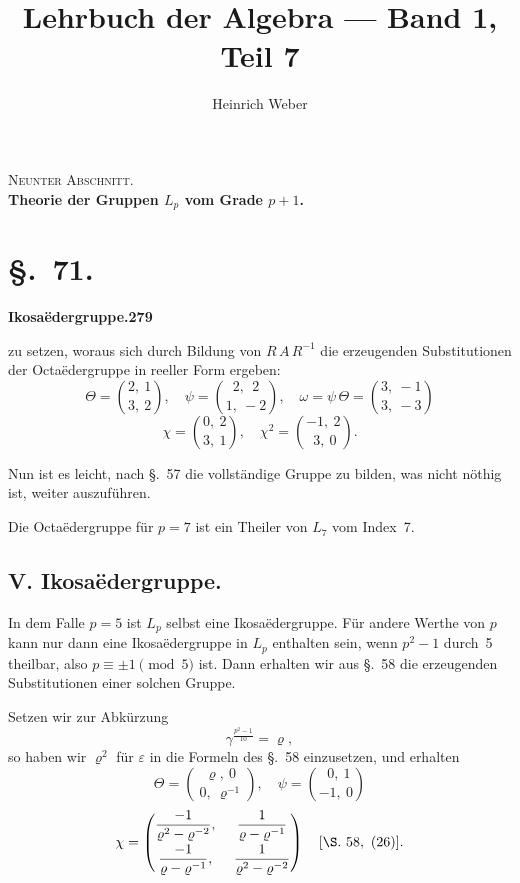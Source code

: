 \documentclass[12pt,a4paper]{article}
\title{Lehrbuch der Algebra --- Band 1, Teil 7}
\author{Heinrich Weber}
\date{}
\begin{document}
\maketitle
\thispagestyle{empty}

\noindent\textsc{Neunter Abschnitt.}\\[4pt]
\noindent\textbf{Theorie der Gruppen $L_p$ vom Grade $p+1$.}

\section*{\S.~71.}
\textbf{Ikosa\"edergruppe.}\hfill\textbf{279}\\[4pt]

zu setzen, woraus sich durch Bildung von $R\,A\,R^{-1}$ die erzeugenden Substitutionen der Octa\"edergruppe in reeller Form ergeben:
\begin{equation}
\Theta = \binom{2,\ 1}{3,\ 2},\quad \psi = \binom{2,\ \ 2}{1,\ -2},\quad \omega = \psi\,\Theta = \binom{3,\ -1}{3,\ -3}
\tag{11}
\end{equation}
\[
\chi = \binom{0,\ 2}{3,\ 1},\quad \chi^2 = \binom{-1,\ 2}{\ 3,\ 0}.
\]

Nun ist es leicht, nach \S.~57 die vollst\"andige Gruppe zu bilden, was nicht n\"othig ist, weiter auszuf\"uhren.

Die Octa\"edergruppe f\"ur $p=7$ ist ein Theiler von $L_7$ vom Index~7.

\subsection*{V. Ikosa\"edergruppe.}

In dem Falle $p=5$ ist $L_p$ selbst eine Ikosa\"edergruppe. F\"ur andere Werthe von $p$ kann nur dann eine Ikosa\"edergruppe in $L_p$ enthalten sein, wenn $p^2-1$ durch~5 theilbar, also $p \equiv \pm 1 \pmod 5$ ist. Dann erhalten wir aus \S.~58 die erzeugenden Substitutionen einer solchen Gruppe.

Setzen wir zur Abk\"urzung
\[
\gamma^{\frac{p^2-1}{10}} = \varrho,
\]
so haben wir $\varrho^2$ f\"ur $\varepsilon$ in die Formeln des \S.~58 einzusetzen, und erhalten
\begin{equation}
\Theta = \binom{\varrho,\ 0}{\ 0,\ \varrho^{-1}},\quad \psi = \binom{\ \ 0,\ 1}{-1,\ 0}
\tag{12}
\end{equation}
\[
\chi = \begin{pmatrix}
\dfrac{-1}{\varrho^2 - \varrho^{-2}},\ &\dfrac{1}{\varrho - \varrho^{-1}}\\[8pt]
\dfrac{-1}{\varrho - \varrho^{-1}},\ &\dfrac{1}{\varrho^2 - \varrho^{-2}}
\end{pmatrix}
\quad [\S.\ 58,\ (26)].
\]
\end{document}
